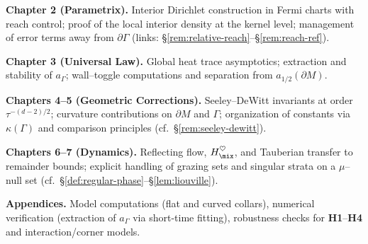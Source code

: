 \noindent\textbf{Chapter 2 (Parametrix).}
Interior Dirichlet construction in Fermi charts with reach control; proof of the local interior density at the kernel level; management of error terms away from $\partial\Gamma$ (links: \S\ref{rem:relative-reach}–\S\ref{rem:reach-ref}).

\noindent\textbf{Chapter 3 (Universal Law).}
Global heat trace asymptotics; extraction and stability of $a_\Gamma$; wall–toggle computations and separation from $a_{1/2}(\partial M)$.

\noindent\textbf{Chapters 4–5 (Geometric Corrections).}
Seeley–DeWitt invariants at order $\tau^{-(d-2)/2}$; curvature contributions on $\partial M$ and $\Gamma$; organization of constants via $\kappa(\Gamma)$ and comparison principles (cf.\ \S\ref{rem:seeley-dewitt}).

\noindent\textbf{Chapters 6–7 (Dynamics).}
Reflecting flow, $H_{\mix}^{\heartsuit}$, and Tauberian transfer to remainder bounds; explicit handling of grazing sets and singular strata on a $\mu$–null set (cf.\ \S\ref{def:regular-phase}–\S\ref{lem:liouville}).

\noindent\textbf{Appendices.}
Model computations (flat and curved collars), numerical verification (extraction of $a_\Gamma$ via short-time fitting), robustness checks for \textbf{H1}–\textbf{H4} and interaction/corner models.

